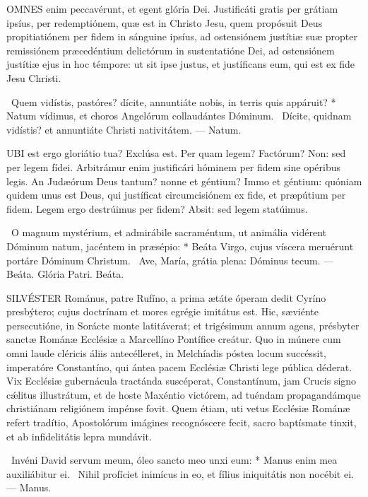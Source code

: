 
\lettrine[lines=2]{O}{MNES} enim peccavérunt, et egent glória Dei. Justificáti gratis per grátiam ipsíus, per redemptiónem, quæ est in Christo Jesu, quem propósuit Deus propitiatiónem per fidem in sánguine ipsíus, ad ostensiónem justítiæ suæ propter remissiónem præcedéntium delictórum in sustentatióne Dei, ad ostensiónem justítiæ ejus in hoc témpore: ut sit ipse justus, et justíficans eum, qui est ex fide Jesu Christi.

\R\ Quem vidístis, pastóres? dícite, annuntiáte nobis, in terris quis appáruit? * Natum vídimus, et choros Angelórum collaudántes Dóminum. \V\ Dícite, quidnam vidístis? et annuntiáte Christi nativitátem. --- Natum.


\lettrine[lines=2]{U}{BI} est ergo gloriátio tua? Exclúsa est. Per quam legem? Factórum? Non: sed per legem fídei. Arbitrámur enim justificári hóminem per fidem sine opéribus legis. An Judæórum Deus tantum? nonne et géntium? Immo et géntium: quóniam quidem unus est Deus, qui justíficat circumcisiónem ex fide, et præpútium per fidem. Legem ergo destrúimus per fidem? Absit: sed legem statúimus.

\R\ O magnum mystérium, et admirábile sacraméntum, ut animália vidérent Dóminum natum, jacéntem in præsépio: * Beáta Virgo, cujus víscera meruérunt portáre Dóminum Christum. \V\ Ave, María, grátia plena: Dóminus tecum. --- Beáta. Glória Patri. Beáta.



\lettrine[lines=2]{S}{ILVÉSTER} Románus, patre Rufíno, a prima ætáte óperam dedit Cyríno presbýtero; cujus doctrínam et mores egrégie imitátus est. Hic, sæviénte persecutióne, in Sorácte monte latitáverat; et trigésimum annum agens, présbyter sanctæ Románæ Ecclésiæ a Marcellíno Pontífice creátur. Quo in múnere cum omni laude cléricis áliis antecélleret, in Melchíadis póstea locum succéssit, imperatóre Constantíno, qui ántea pacem Ecclésiæ Christi lege pública déderat. Vix Ecclésiæ gubernácula tractánda suscéperat, Constantínum, jam Crucis signo cǽlitus illustrátum, et de hoste Maxéntio victórem, ad tuéndam propagandámque christiánam religiónem impénse fovit. Quem étiam, uti vetus Ecclésiæ Románæ refert tradítio, Apostolórum imágines recognóscere fecit, sacro baptísmate tinxit, et ab infidelitátis lepra mundávit.

\R\ Invéni David servum meum, óleo sancto meo unxi eum: * Manus enim mea auxiliábitur ei. \V\ Nihil profíciet inimícus in eo, et fílius iniquitátis non nocébit ei. --- Manus.

